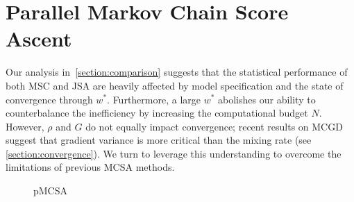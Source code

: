 
\vspace{-1.5ex}
\section{Parallel Markov Chain Score Ascent}\label{section:pmcsa}
\vspace{-1.5ex}
Our analysis in~\cref{section:comparison} suggests that the statistical performance of both MSC and JSA are heavily affected by model specification and the state of convergence through \(w^*\).
Furthermore, a large \(w^*\) abolishes our ability to counterbalance the inefficiency by increasing the computational budget \(N\).
However, \(\rho\) and \(G\) do not equally impact convergence; recent results on MCGD suggest that gradient variance is more critical than the mixing rate (see \cref{section:convergence}).
We turn to leverage this understanding to overcome the limitations of previous MCSA methods.

\begin{wrapfigure}[13]{r}{0.43\textwidth}
\vspace{-6ex}
\begin{minipage}[c]{0.43\textwidth}
  \begin{algorithm2e}[H]
    \DontPrintSemicolon
    \SetAlgoLined
    \caption{pMCSA}\label{alg:pmcsa}
  \end{algorithm2e}
\end{minipage}
\end{wrapfigure}
%
%
\vspace{-1.5ex}
